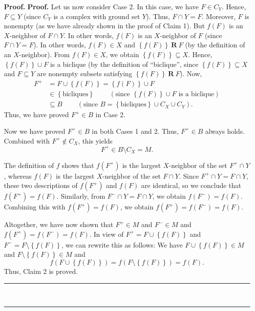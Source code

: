\documentclass[numbers=enddot,12pt,final,onecolumn,notitlepage]{scrartcl}%
\theoremstyle{definition}
\newenvironment{proof}[1][Proof]{\noindent\textbf{#1.} }{\ \rule{0.5em}{0.5em}}
\begin{document}
\begin{proof}
\begin{proof}
Let us now consider Case 2. In this case, we have $F\in C_{Y}$. Hence,
$F\subseteq Y$ (since $C_{Y}$ is a complex with ground set $Y$). Thus, $F\cap
Y=F$. Moreover, $F$ is nonempty (as we have already shown in the proof of
Claim 1). But $f\left(  F\right)  $ is an $X$-neighbor of $F\cap Y$. In other
words, $f\left(  F\right)  $ is an $X$-neighbor of $F$ (since $F\cap Y=F$). In
other words, $f\left(  F\right)  \in X$ and $\left\{  f\left(  F\right)
\right\}  \ \mathbf{R}\ F$ (by the definition of an $X$-neighbor). From
$f\left(  F\right)  \in X$, we obtain $\left\{  f\left(  F\right)  \right\}
\subseteq X$. Hence, $\left\{  f\left(  F\right)  \right\}  \cup F$ is a
biclique (by the definition of \textquotedblleft biclique\textquotedblright,
since $\left\{  f\left(  F\right)  \right\}  \subseteq X$ and $F\subseteq Y$
are nonempty subsets satisfying $\left\{  f\left(  F\right)  \right\}
\ \mathbf{R}\ F$). Now,%
\begin{align*}
F^{+}  &  =F\cup\left\{  f\left(  F\right)  \right\}  =\left\{  f\left(
F\right)  \right\}  \cup F\\
&  \in\left\{  \text{bicliques}\right\}  \ \ \ \ \ \ \ \ \ \ \left(
\text{since }\left\{  f\left(  F\right)  \right\}  \cup F\text{ is a
biclique}\right) \\
&  \subseteq B\ \ \ \ \ \ \ \ \ \ \left(  \text{since }B=\left\{
\text{bicliques}\right\}  \cup C_{X}\cup C_{Y}\right)  .
\end{align*}
Thus, we have proved $F^{+}\in B$ in Case 2.

Now we have proved $F^{+}\in B$ in both Cases 1 and 2. Thus, $F^{+}\in B$
always holds. Combined with $F^{+}\notin C_{X}$, this yields
\[
F^{+}\in B\setminus C_{X}=M.
\]


The definition of $f$ shows that $f\left(  F^{+}\right)  $ is the largest
$X$-neighbor of the set $F^{+}\cap Y$, whereas $f\left(  F\right)  $ is the
largest $X$-neighbor of the set $F\cap Y$. Since $F^{+}\cap Y=F\cap Y$, these
two descriptions of $f\left(  F^{+}\right)  $ and $f\left(  F\right)  $ are
identical, so we conclude that $f\left(  F^{+}\right)  =f\left(  F\right)  $.
Similarly, from $F^{-}\cap Y=F\cap Y$, we obtain $f\left(  F^{-}\right)
=f\left(  F\right)  $. Combining this with $f\left(  F^{+}\right)  =f\left(
F\right)  $, we obtain $f\left(  F^{+}\right)  =f\left(  F^{-}\right)
=f\left(  F\right)  $.

Altogether, we have now shown that $F^{+}\in M$ and $F^{-}\in M$ and $f\left(
F^{+}\right)  =f\left(  F^{-}\right)  =f\left(  F\right)  $. In view of
$F^{+}=F\cup\left\{  f\left(  F\right)  \right\}  $ and $F^{-}=F\setminus
\left\{  f\left(  F\right)  \right\}  $, we can rewrite this as follows: We
have $F\cup\left\{  f\left(  F\right)  \right\}  \in M$ and $F\setminus
\left\{  f\left(  F\right)  \right\}  \in M$ and%
\[
f\left(  F\cup\left\{  f\left(  F\right)  \right\}  \right)  =f\left(
F\setminus\left\{  f\left(  F\right)  \right\}  \right)  =f\left(  F\right)
.
\]
Thus, Claim 2 is proved.
\end{proof}


\end{proof}
\end{document}

